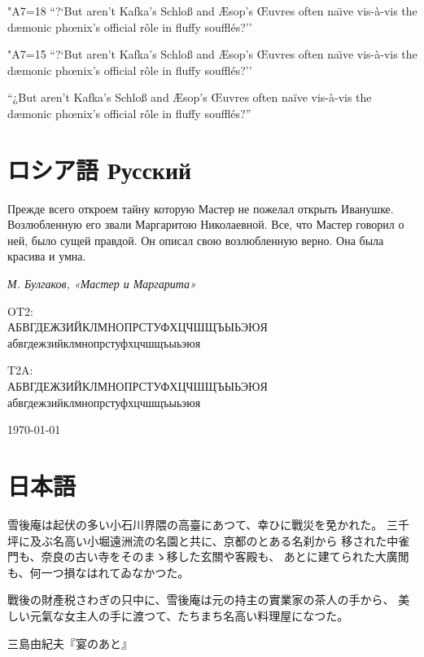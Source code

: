 \documentclass{ujarticle}
\DeclareRobustCommand\jpnrm{\kanjifamily{jpnrm}\selectfont}
\begin{document}
\kcatcode"A7=18%
``?`But aren't Kafka's Schlo{\ss} and {\AE}sop's {\OE}uvres
often na{\"\i}ve  vis-\`a-vis the d{\ae}monic ph{\oe}nix's official r\^ole
in fluffy souffl\'es?''

\kcatcode"A7=15%
``?`But aren't Kafka's Schlo{\ss} and {\AE}sop's {\OE}uvres
often na{\"\i}ve  vis-\`a-vis the d{\ae}monic ph{\oe}nix's official r\^ole
in fluffy souffl\'es?''

“¿But aren’t Kafka’s Schloß and Æsop’s Œuvres
often naïve vis-à-vis the dæmonic phœnix’s official rôle
in fluffy soufflés?”

\section{ロシア語 \selectfont{}Русский}
\selectfont
Прежде всего откроем тайну которую Мастер не пожелал
открыть Иванушке.
Возлюбленную его звали Маргаритою Николаевной.
Все, что Мастер говорил о ней, было сущей правдой.
Он описал свою возлюбленную верно.
Она была красива и умна.

\hfill {\em М. Булгаков, «Мастер и Маргарита»}
\qquad\qquad

OT2:\\
\selectfont
АБВГДЕЖЗИЙКЛМНОПРСТУФХЦЧШЩЪЫЬЭЮЯ\\
абвгдежзийклмнопрстуфхцчшщъыьэюя

T2A:\\
\selectfont
АБВГДЕЖЗИЙКЛМНОПРСТУФХЦЧШЩЪЫЬЭЮЯ\\
абвгдежзийклмнопрстуфхцчшщъыьэюя

\hfill\today

\selectfont

\section{日本語}
\jpnrm
雪後庵は起伏の多い小石川界隈の高臺にあつて、幸ひに戰災を免かれた。
三千坪に及ぶ名高い小堀遠洲流の名園と共に、京都のとある名刹から
移された中雀門も、奈良の古い寺をそのまゝ移した玄關や客殿も、
あとに建てられた大廣閒も、何一つ損なはれてゐなかつた。

戰後の財產税さわぎの只中に、雪後庵は元の持主の實業家の茶人の手から、
美しい元氣な女主人の手に渡つて、たちまち名高い料理屋になつた。

\hfill 三島由紀夫『宴のあと』\qquad\qquad
\end{document}
